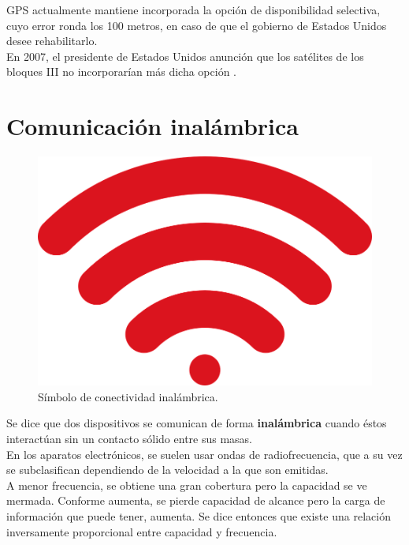GPS actualmente mantiene incorporada la opción de disponibilidad selectiva, cuyo error ronda los 100 metros, en caso de que el gobierno de Estados Unidos desee rehabilitarlo. \\

En 2007, el presidente de Estados Unidos anunción que los satélites de los bloques III no incorporarían más dicha opción \citep{chafer2017diseno}.

\section{Comunicación inalámbrica}

\begin{figure}[H]
\centering
\includegraphics[scale=0.30]{Figures/wireless2}
\caption[Símbolo de conectividad inalámbrica.]{Símbolo de conectividad inalámbrica\footnotemark.}
\label{fig:ErrWrl}
\end{figure}


Se dice que dos dispositivos se comunican de forma \textbf{inalámbrica} cuando éstos interactúan sin un contacto sólido entre sus masas. \\

En los aparatos electrónicos, se suelen usar ondas de radiofrecuencia, que a su vez se subclasifican dependiendo de la velocidad a la que son emitidas.\\

A menor frecuencia, se obtiene una gran cobertura pero la capacidad se ve mermada. Conforme aumenta, se pierde capacidad de alcance pero la carga de información que puede tener, aumenta. Se dice entonces que existe una relación inversamente proporcional entre capacidad y frecuencia.\\

